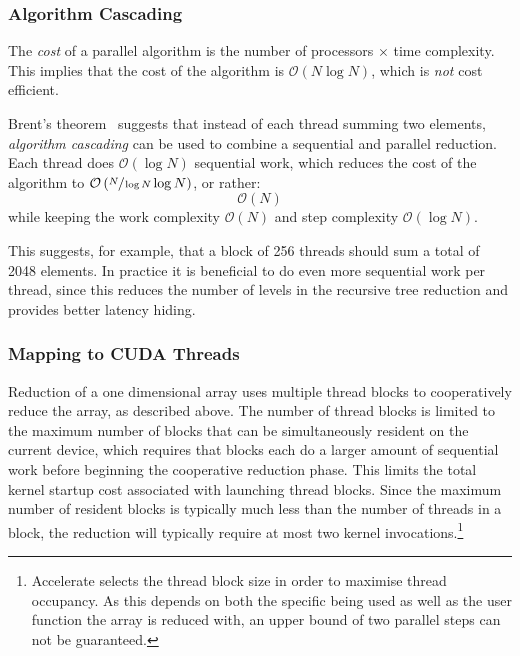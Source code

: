 \subsubsection{Algorithm Cascading}
\label{sec:algorithm_cascading}

The \emph{cost} of a parallel algorithm is the number of processors $\times$
time complexity. This implies that the cost of the algorithm is
$\mathcal{O}\left( N \log N \right)$, which is \emph{not} cost efficient.

Brent's theorem~\cite{Chatterjee:2009vh} suggests that instead of each thread
summing two elements, \emph{algorithm cascading} can be used to combine a
sequential and parallel reduction. Each thread does $\mathcal{O}\left( \log N
\right)$ sequential work, which reduces the cost of the algorithm to
$\mathcal{O}\left( \sfrac{N}{\log N} \log N \right)$, or rather:
\[
\mathcal{O}\left( N \right)
\]
while keeping the work complexity $\mathcal{O}\left( N \right)$ and step
complexity $\mathcal{O}\left( \log N \right)$.

This suggests, for example, that a block of 256 threads should sum a total of
2048 elements. In practice it is beneficial to do even more sequential work per
thread, since this reduces the number of levels in the recursive tree reduction
and provides better latency hiding.


\subsubsection{Mapping to CUDA Threads}

Reduction of a one dimensional array uses multiple thread blocks to
cooperatively reduce the array, as described above. The number of thread blocks
is limited to the maximum number of blocks that can be simultaneously resident
on the current device, which requires that blocks each do a larger amount of
sequential work before beginning the cooperative reduction phase. This limits
the total kernel startup cost associated with launching thread blocks. Since the
maximum number of resident blocks is typically much less than the number of
threads in a block, the reduction will typically require at most two kernel
invocations.\footnote{Accelerate selects the thread block size in order to
maximise thread occupancy. As this depends on both the specific \GPU being used
as well as the user function the array is reduced with, an upper bound of two
parallel steps can not be guaranteed.}

